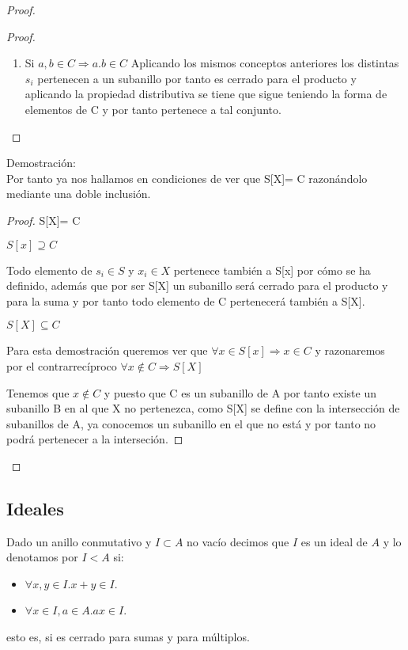 \begin{proof}
\begin{proof}
\begin{enumerate}
	\item Si $a,b \in C \Rightarrow a.b \in C $
 Aplicando los mismos conceptos anteriores los distintas $s_i$ pertenecen a un subanillo por tanto es cerrado para el producto y aplicando la propiedad distributiva se tiene que sigue teniendo la forma de elementos de C y por tanto pertenece a tal conjunto.
	\end{enumerate}
    \end{proof}
	Demostración: \\
	Por tanto ya nos hallamos en condiciones de ver que S[X]= C razonándolo mediante una doble inclusión.
	\begin{proof}
	S[X]= C


	$ S[x] \supseteq C $

	Todo elemento de $s_i \in S $ y $x_i \in X$ pertenece también a S[x] por cómo se ha definido, además que por ser S[X] un subanillo será cerrado para el producto y para la suma y
por tanto todo elemento de C pertenecerá también a S[X].

	$ S[X] \subseteq C$

	Para esta demostración queremos ver que $ \forall x \in S[x] \Rightarrow x  \in C$ y razonaremos por el contrarrecíproco $\forall x \notin C \Rightarrow S[X]$

	Tenemos que $ x \notin C $ y puesto que C es un subanillo de A por tanto existe un subanillo B en al que X no pertenezca, como S[X] se define con la intersección de subanillos de A, ya conocemos un subanillo en el que no está y por tanto no podrá pertenecer a la interseción.

	\end{proof}
\end{proof}

\subsection{Ideales}

\begin{definition}
Dado un anillo conmutativo y $I \subset A$ no vacío decimos que $I$ es un ideal de $A$ y lo denotamos por $I < A$ si:

\begin{itemize}
\item $\forall x,y \in I. x + y \in I$.
\item $\forall x \in I,a \in A. ax \in I$. 
\end{itemize}

esto es, si es cerrado para sumas y para múltiplos.
\end{definition}

